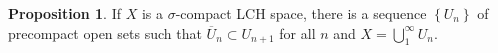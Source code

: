 \documentclass[12pt,a4paper]{book}
\newenvironment{prooff}{{\noindent\it\textcolor{cyan!40!black}{Proof}:}\,}{\par}
\theoremstyle{definition}
\newtheorem{prop}[defn]{Proposition}
\begin{document}
\begin{prop}
    If $X$ is a $\sigma$-compact LCH space, there is a sequence $\left\{U_n\right\}$ of precompact open sets such that $\overline{U}_n \subset U_{n+1}$ for all $n$ and $X=\bigcup_1^{\infty} U_n$. 
\end{prop}




\newpage 
\end{document}
